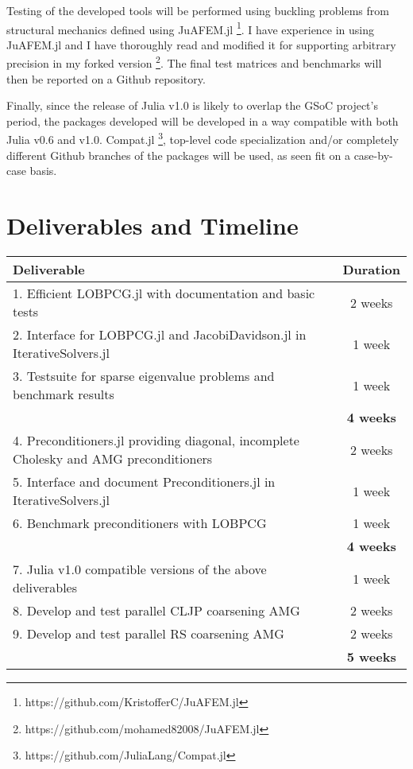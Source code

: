 \documentclass[12pt]{article}
\begin{document}
Testing of the developed tools will be performed using buckling problems from structural mechanics defined using JuAFEM.jl \footnote{https://github.com/KristofferC/JuAFEM.jl}. I have experience in using JuAFEM.jl and I have thoroughly read and modified it for supporting arbitrary precision in my forked version \footnote{https://github.com/mohamed82008/JuAFEM.jl}. The final test matrices and benchmarks will then be reported on a Github repository.

Finally, since the release of Julia v1.0 is likely to overlap the GSoC project's period, the packages developed will be developed in a way compatible with both Julia v0.6 and v1.0. Compat.jl \footnote{https://github.com/JuliaLang/Compat.jl}, top-level code specialization and/or completely different Github branches of the packages will be used, as seen fit on a case-by-case basis.

\section{Deliverables and Timeline}

\begin{center}
 \begin{tabular}{||p{12cm} | c||}
 \hline
 \textbf{Deliverable} & \textbf{Duration} \\ [0.5ex] 
 \hline\hline
 1. Efficient LOBPCG.jl with documentation and basic tests & 2 weeks \\ 
 2. Interface for LOBPCG.jl and JacobiDavidson.jl in IterativeSolvers.jl & 1 week \\
 3. Testsuite for sparse eigenvalue problems and benchmark results & 1 week \\
 \hline
 \hline
  & \textbf{4 weeks} \\
 \hline
 \hline
 4. Preconditioners.jl providing diagonal, incomplete Cholesky and AMG preconditioners & 2 weeks \\
 5. Interface and document Preconditioners.jl in IterativeSolvers.jl & 1 week \\
 6. Benchmark preconditioners with LOBPCG & 1 week \\ [1ex] 
 \hline
 \hline
  & \textbf{4 weeks} \\
 \hline
 \hline
 7. Julia v1.0 compatible versions of the above deliverables & 1 week \\
 8. Develop and test parallel CLJP coarsening AMG & 2 weeks \\ 
 9. Develop and test parallel RS coarsening AMG & 2 weeks \\
 \hline
 \hline
  & \textbf{5 weeks} \\
 \hline
 \hline
\end{tabular}
\end{center}



\def\bibfont{\footnotesize}
\renewcommand{\bibsection}{\section{\bibname} \label{References}}


\end{document}
